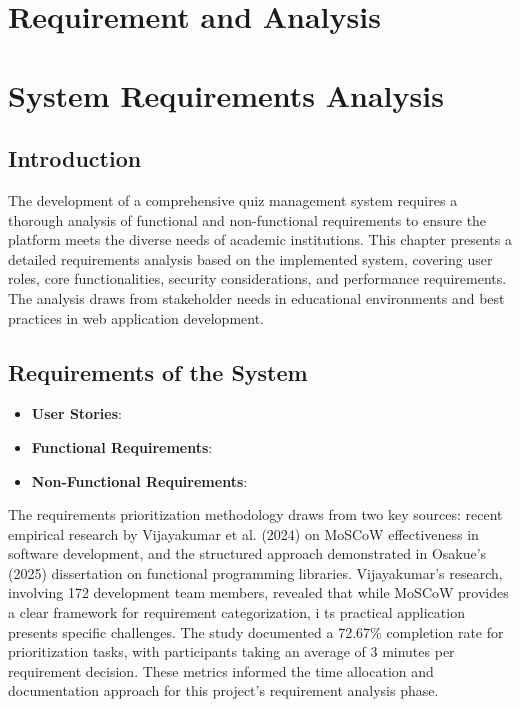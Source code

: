 \chapter{Requirement and Analysis}

\chapter{System Requirements Analysis}

\section{Introduction}

The development of a comprehensive quiz management system requires a thorough analysis of functional and non-functional requirements to ensure the platform meets the diverse needs of academic institutions. This chapter presents a detailed requirements analysis based on the implemented system, covering user roles, core functionalities, security considerations, and performance requirements. The analysis draws from stakeholder needs in educational environments and best practices in web application development.

\section{Requirements of the System}



\begin{itemize}
    \item \textbf{User Stories}: 
    \item \textbf{Functional Requirements}: 
    \item \textbf{Non-Functional Requirements}: 
\end{itemize}

The requirements prioritization methodology draws from two key sources: recent empirical research by Vijayakumar et al. (2024) on MoSCoW effectiveness in software development,
 and the structured approach demonstrated in Osakue's (2025) dissertation on functional programming libraries. 
 Vijayakumar's research, involving 172 development team members, revealed that while MoSCoW provides a clear framework for requirement categorization, i
 ts practical application presents specific challenges. The study documented a 72.67\% completion rate for prioritization tasks, 
 with participants taking an average of 3 minutes per requirement decision. These metrics informed the time allocation and documentation approach for this project's requirement analysis phase.

